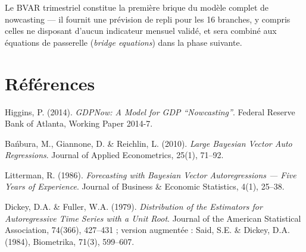 \documentclass[11pt,a4paper]{article}
\begin{document}
Le BVAR trimestriel constitue la première brique du modèle complet de nowcasting --- il fournit une prévision de repli pour les 16 branches, y compris celles ne disposant d'aucun indicateur mensuel validé, et sera combiné aux équations de passerelle (\emph{bridge equations}) dans la phase suivante.

\section*{Références}
\begin{enumerate}[leftmargin=1.6em, label=\textbf{[\arabic*]}]
\item \hypertarget{ref1}{} Higgins, P. (2014). \textit{GDPNow: A Model for GDP ``Nowcasting''}. Federal Reserve Bank of Atlanta, Working Paper 2014-7.
\item \hypertarget{ref2}{} Bańbura, M., Giannone, D. \& Reichlin, L. (2010). \textit{Large Bayesian Vector Auto Regressions}. Journal of Applied Econometrics, 25(1), 71--92.
\item \hypertarget{ref3}{} Litterman, R. (1986). \textit{Forecasting with Bayesian Vector Autoregressions --- Five Years of Experience}. Journal of Business \& Economic Statistics, 4(1), 25--38.
\item \hypertarget{ref4}{} Dickey, D.A. \& Fuller, W.A. (1979). \textit{Distribution of the Estimators for Autoregressive Time Series with a Unit Root}. Journal of the American Statistical Association, 74(366), 427--431 ; version augmentée : Said, S.E. \& Dickey, D.A. (1984), Biometrika, 71(3), 599--607.
\end{enumerate}
\end{document}
